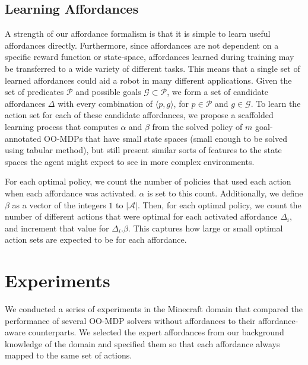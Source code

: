 \documentclass[letterpaper]{article}
\begin{document}
\subsection{Learning Affordances}

A strength of our affordance formalism is that it is simple to learn useful affordances directly. Furthermore, since affordances
are not dependent on a specific reward function or state-space, affordances learned during training may be transferred to a wide variety
of different tasks. This means that a single set of learned affordances could aid a robot in many different applications.
Given the set of predicates $\mathcal{P}$ and possible goals $\mathcal{G} \subset \mathcal{P}$, we form a set of candidate affordances $\Delta$ with every combination of $\langle p, g \rangle$, for $p \in \mathcal{P}$ and $g \in \mathcal{G}$.
To learn the action set for each of these candidate affordances, we propose a scaffolded learning process that computes $\alpha$ and $\beta$ from the
solved policy of $m$ goal-annotated OO-MDPs that have small state spaces (small enough to be solved using tabular method), but still present similar sorts of features to the state spaces the agent might expect to see in more complex environments.

For each optimal policy, we count the number of policies that used each action 
when each affordance was activated. $\alpha$ is set to this count. Additionally, we define $\beta$ as a vector of the integers $1$ to $|\mathcal{A}|$.
Then, for each optimal policy, we count the number of different actions that were optimal for each activated affordance $\Delta_i$, and increment
that value for $\Delta_i.\beta$. This captures how large or small optimal action sets are expected to be for each affordance.


\section{Experiments}
\label{sec:experiments}

We conducted a series of experiments in the Minecraft domain that
compared the performance of several OO-MDP solvers without affordances
to their affordance-aware counterparts. We selected the expert
affordances from our background knowledge of the domain and specified them 
so that each affordance always mapped to the same set of actions.
\end{document}
